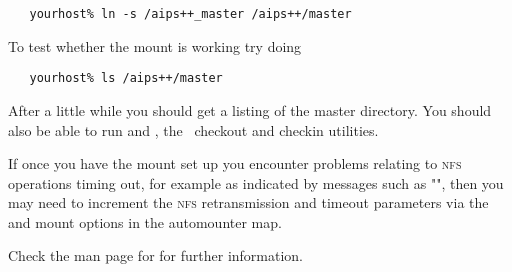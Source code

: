 \begin{verbatim}
   yourhost% ln -s /aips++_master /aips++/master
\end{verbatim}

\noindent
To test whether the mount is working try doing

\begin{verbatim}
   yourhost% ls /aips++/master
\end{verbatim}

\noindent
After a little while you should get a listing of the master directory.  You
should also be able to run  and , the \aipspp\ checkout
and checkin utilities.

If once you have the mount set up you encounter problems relating to
\textsc{nfs} operations timing out, for example as indicated by messages such
as "", then
you may need to increment the \textsc{nfs} retransmission and timeout
parameters via the  and  mount options in the
automounter map.

Check the man page for  for further information.
